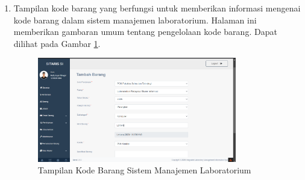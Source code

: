\begin{enumerate}
	\item Tampilan kode barang yang berfungsi untuk memberikan informasi mengenai kode barang dalam sistem manajemen laboratorium. Halaman ini memberikan gambaran umum tentang pengelolaan kode barang. Dapat dilihat pada Gambar \ref{fig:kode-barang}.
	      \begin{figure}
		      \centering
		      \includegraphics[width=0.82\textwidth]{konten/gambar/perbaikan/kode-barang.png}
		      \caption{Tampilan Kode Barang Sistem Manajemen Laboratorium}
		      \label{fig:kode-barang}
	      \end{figure}


\end{enumerate}
